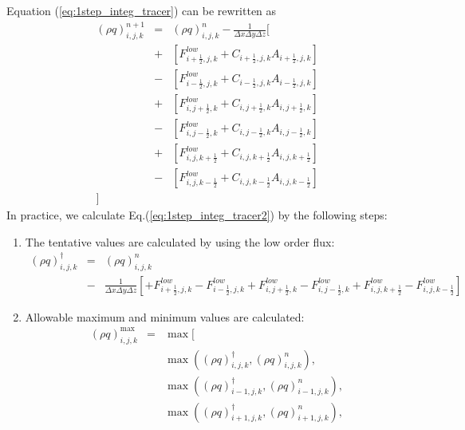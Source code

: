 {Equation (\ref{eq:1step_integ_tracer}) can be rewritten as
\begin{eqnarray}
\left(\rho q\right)^{n+1}_{i,j,k} 
&=& \left(\rho q\right)^{n}_{i,j,k}
- \frac{1}{\Delta x \Delta y \Delta z}
\big[ \nonumber\\
&+&
\left[ F_{i+\frac{1}{2},j,k}^{low}
+ C_{i+\frac{1}{2},j,k}  A_{i+\frac{1}{2},j,k}\right]\nonumber\\
&-&
\left[ F_{i-\frac{1}{2},j,k}^{low}
+ C_{i-\frac{1}{2},j,k}  A_{i-\frac{1}{2},j,k}\right]\nonumber\\
&+&
\left[ F_{i,j+\frac{1}{2},k}^{low}
+ C_{i,j+\frac{1}{2},k}  A_{i,j+\frac{1}{2},k}\right]\nonumber\\
&-&
\left[ F_{i,j-\frac{1}{2},k}^{low}
+ C_{i,j-\frac{1}{2},k}  A_{i,j-\frac{1}{2},k}\right]\nonumber\\
&+&
\left[ F_{i,j,k+\frac{1}{2}}^{low}
+ C_{i,j,k+\frac{1}{2}}  A_{i,j,k+\frac{1}{2}}\right]\nonumber\\
&-&
\left[ F_{i,j,k-\frac{1}{2}}^{low}
+ C_{i,j,k-\frac{1}{2}}  A_{i,j,k-\frac{1}{2}}\right]\nonumber\\
\big]
\label{eq:1step_integ_tracer2}
\end{eqnarray}
In practice, we calculate Eq.(\ref{eq:1step_integ_tracer2}) by the 
following steps:
\begin{enumerate}
%
\item The tentative values are calculated by using the low order flux:
\begin{eqnarray}
\left(\rho q\right)^{\dagger}_{i,j,k} 
&=& \left(\rho q\right)^{n}_{i,j,k}\nonumber\\
&-& \frac{1}{\Delta x \Delta y \Delta z}
\left[
+ F_{i+\frac{1}{2},j,k}^{low}-F_{i-\frac{1}{2},j,k}^{low}
+ F_{i,j+\frac{1}{2},k}^{low}-F_{i,j-\frac{1}{2},k}^{low}
+ F_{i,j,k+\frac{1}{2}}^{low}-F_{i,j,k-\frac{1}{2}}^{low}
\right]
\end{eqnarray}
%
\item Allowable maximum and minimum values are calculated:
\begin{eqnarray}
\left(\rho q\right)^{\max}_{i,j,k}
&=& \max [\nonumber\\
&&\max( \left(\rho q\right)^{\dagger}_{i,j,k},\left(\rho q\right)^{n}_{i,j,k} ),\nonumber\\
&&\max( \left(\rho q\right)^{\dagger}_{i-1,j,k},\left(\rho q\right)^{n}_{i-1,j,k} ),\nonumber\\
&&\max( \left(\rho q\right)^{\dagger}_{i+1,j,k},\left(\rho q\right)^{n}_{i+1,j,k} ),\nonumber\\

\end{eqnarray}
\end{enumerate}}
